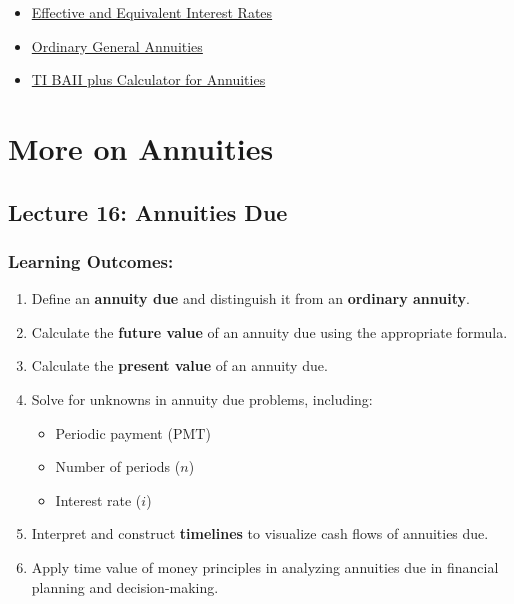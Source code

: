 \documentclass[
]{book}
\providecommand{\tightlist}{%
  \setlength{\itemsep}{0pt}\setlength{\parskip}{0pt}}
\begin{document}
\begin{itemize}
\item
  \href{https://theelementsmath.github.io/M114/annuity-basics.html\#effective-and-equivalent-interest-rates}{Effective and Equivalent Interest Rates}
\item
  \href{https://theelementsmath.github.io/M114/annuity-basics.html\#ordinary-general-annuities}{Ordinary General Annuities}
\item
  \href{https://theelementsmath.github.io/M114/annuity-basics.html\#using-the-ti-baii-plus-calculator-for-annuities}{TI BAII plus Calculator for Annuities}
\end{itemize}

\chapter{More on Annuities}\label{more-on-annuities}

\section*{Lecture 16: Annuities Due}\label{lecture-16-annuities-due}

\subsection*{Learning Outcomes:}\label{learning-outcomes-15}

\begin{enumerate}
\def\labelenumi{\arabic{enumi}.}
\tightlist
\item
  Define an \textbf{annuity due} and distinguish it from an \textbf{ordinary annuity}.
\item
  Calculate the \textbf{future value} of an annuity due using the appropriate formula.
\item
  Calculate the \textbf{present value} of an annuity due.
\item
  Solve for unknowns in annuity due problems, including:

  \begin{itemize}
  \tightlist
  \item
    Periodic payment (\(\text{PMT}\))
  \item
    Number of periods (\(n\))
  \item
    Interest rate (\(i\))
  \end{itemize}
\item
  Interpret and construct \textbf{timelines} to visualize cash flows of annuities due.
\item
  Apply time value of money principles in analyzing annuities due in financial planning and decision-making.
\end{enumerate}
\end{document}
